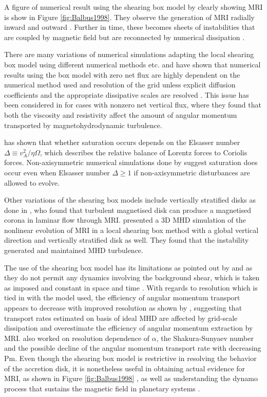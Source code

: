 \documentclass{jfm}
\begin{document}
A figure of numerical result using the shearing box model by \cite{Balbus1998}
clearly showing MRI  is show in Figure \ref{fig:Balbus1998}. They observe the
generation of MRI radially inward and outward \cite{Balbus1991}. Further in
time, these becomes sheets of instabilities \cite{Hawley1992} that are coupled
by magnetic field but are reconnected by numerical dissipation
\cite{Julien2010}.

There are many variations of numerical simulations adapting the local shearing
box model using different numerical methods etc. \cite{Fromang&Papaloizou2007}
and \cite{Fromang2007} have shown that numerical results using the box model
with zero net flux are highly dependent on the numerical method used and
resolution of the grid unless explicit diffusion coefficients and the
appropriate dissipative scales are resolved . This issue has been considered in
\cite{Lesur2007} for cases with nonzero net vertical flux, where they found
that both the viscosity and resistivity affect the amount of angular momentum
transported by magnetohydrodynamic turbulence.

\cite{Sano1998} has shown that whether saturation occurs depends on the
Elsasser number $\Delta \equiv v^2_A/\eta \Omega$, which describes the relative
balance of Lorentz forces to Coriolis forces. Non-axisymmetric numerical
simulations done by \cite{Fleming2000} suggest saturation does occur even when
Elsasser number $  \Delta \ge 1$ if non-axisymmetric disturbances are allowed
to evolve.

Other variations of the shearing box models include vertically stratified disks
as done in \cite{Miller1999}, who found that turbulent magnetised disk can
produce a magnetised corona in laminar flow through MRI. \cite{Stone1996}
presented a 3D MHD simulation of the nonlinear evolution of MRI in a local
shearing box method with a global vertical direction and vertically stratified
disk as well. They found that the instability generated and maintained MHD
turbulence.

The use of the shearing box model has its limitations as pointed out by
\cite{Hawley1995} and \cite{Regev2008} as they do not permit any dynamics
involving the background shear, which is taken as imposed and constant in space
and time \citep{Regev2008}. With regards to resolution which is tied in with
the model used, the efficiency of angular momentum transport appears to
decrease with improved resolution as shown by \cite{Fromang2007}, suggesting
that transport rates estimated on basis of ideal MHD are affected by grid-scale
dissipation and overestimate the efficiency of angular momentum extraction by
MRI.  \cite{Kapyla2011} also worked on resolution dependence of $\alpha$, the
Shakura-Sunyaev number and the possible decline of the angular momentum
transport rate with decreasing Pm. Even though the shearing box model is
restrictive in resolving the behavior of the accretion disk, it is nonetheless
useful in obtaining actual evidence for MRI, as shown in Figure
\ref{fig:Balbus1998} \citep{Balbus1998}, as well as understanding the dynamo
process that sustains the magnetic field in planetary systems \cite{Lesur2008}.
\end{document}

